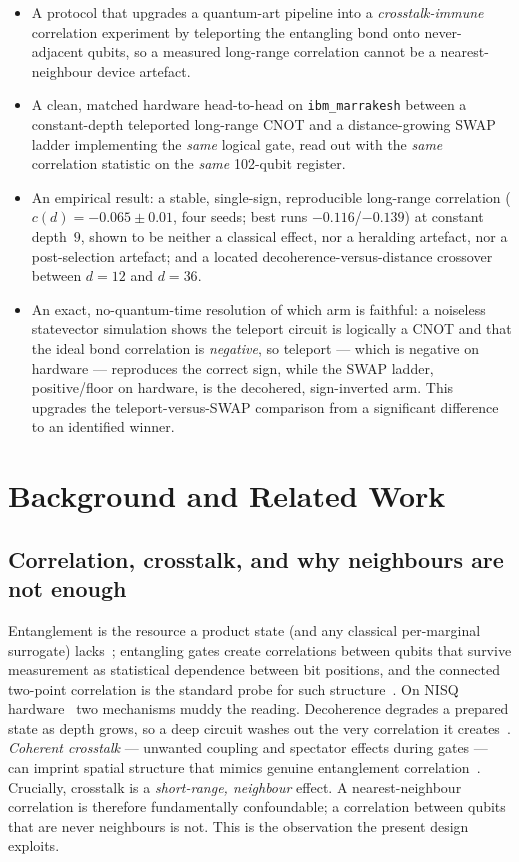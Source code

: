 \documentclass[conference]{IEEEtran}
\begin{document}
\begin{itemize}
\item A protocol that upgrades a quantum-art pipeline into a \emph{crosstalk-immune}
correlation experiment by teleporting the entangling bond onto never-adjacent qubits, so a
measured long-range correlation cannot be a nearest-neighbour device artefact.
\item A clean, matched hardware head-to-head on \texttt{ibm\_marrakesh} between a
constant-depth teleported long-range CNOT and a distance-growing SWAP ladder implementing
the \emph{same} logical gate, read out with the \emph{same} correlation statistic on the
\emph{same} 102-qubit register.
\item An empirical result: a stable, single-sign, reproducible long-range correlation
($c(d){=}-0.065\pm0.01$, four seeds; best runs $-0.116$/$-0.139$) at constant depth~$9$,
shown to be neither a classical effect, nor a heralding artefact, nor a post-selection
artefact; and a located decoherence-versus-distance crossover between $d{=}12$ and
$d{=}36$.
\item An exact, no-quantum-time resolution of which arm is faithful: a noiseless
statevector simulation shows the teleport circuit is logically a CNOT and that the ideal
bond correlation is \emph{negative}, so teleport --- which is negative on hardware ---
reproduces the correct sign, while the SWAP ladder, positive/floor on hardware, is the
decohered, sign-inverted arm. This upgrades the teleport-versus-SWAP comparison from a
significant difference to an identified winner.
\end{itemize}

\section{Background and Related Work}

\subsection{Correlation, crosstalk, and why neighbours are not enough}

Entanglement is the resource a product state (and any classical per-marginal surrogate)
lacks~\cite{horodecki2009}; entangling gates create correlations between qubits that
survive measurement as statistical dependence between bit positions, and the connected
two-point correlation is the standard probe for such structure~\cite{sachdev2011}. On NISQ
hardware~\cite{preskill2018} two mechanisms muddy the reading. Decoherence degrades a
prepared state as depth grows, so a deep circuit washes out the very correlation it
creates~\cite{zurek2003}. \emph{Coherent crosstalk} --- unwanted coupling and spectator
effects during gates --- can imprint spatial structure that mimics genuine entanglement
correlation~\cite{sarovar2020}. Crucially, crosstalk is a \emph{short-range, neighbour}
effect. A nearest-neighbour correlation is therefore fundamentally confoundable; a
correlation between qubits that are never neighbours is not. This is the observation the
present design exploits.
\end{document}
